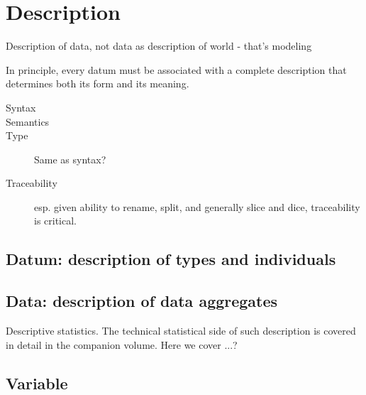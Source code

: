 \part{Description}

\begin{ednote}
  Description of data, not data as description of world - that's modeling
\end{ednote}

In principle, every datum must be associated with a complete
description that determines both its form and its meaning.

\begin{description}
\item [Syntax]
\item [Semantics]
\item [Type]  Same as syntax?
\item [Traceability] esp. given ability to rename, split, and
  generally slice and dice, traceability is critical.
\end{description}

\chapter{Datum: description of types and individuals}

\chapter{Data: description of data aggregates}

Descriptive statistics.  The technical statistical side of such
description is covered in detail in the companion volume.  Here we
cover ...?

\chapter{Variable}


